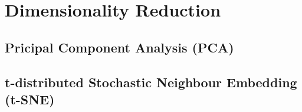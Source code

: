 \section{Dimensionality Reduction}

\subsection{Pricipal Component Analysis (PCA)}

\subsection{t-distributed Stochastic Neighbour Embedding (t-SNE)}